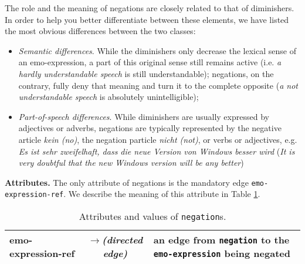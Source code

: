 \documentclass[11pt,a4paper]{article}
\newlength{\clmnwidth}
\theoremstyle{mytheoremstyle}
\begin{document}
The role and the meaning of negations are closely related to that of
diminishers.  In order to help you better differentiate between these
elements, we have listed the most obvious differences between the two
classes:
\begin{itemize}
  \item\textit{Semantic differences}.  While the diminishers only
    decrease the lexical sense of an emo-expression, a part of this
    original sense still remains active (i.e. \textit{a hardly
      understandable speech} is still understandable); negations, on
    the contrary, fully deny that meaning and turn it to the complete
    opposite (\textit{a not understandable speech} is absolutely
    unintelligible);

  \item\textit{Part-of-speech differences}.  While diminishers are
    usually expressed by adjectives or adverbs, negations are
    typically represented by the negative article \textit{kein (no)},
    the negation particle \textit{nicht (not)}, or verbs or
    adjectives, e.g.  \textit{Es ist sehr zweifelhaft, dass die neue
      Version von Windows besser wird} (\textit{It is very doubtful
      that the new Windows version will be any better})

\end{itemize}

\noindent\textbf{Attributes.} The only attribute of negations is the
mandatory edge \texttt{emo-expression-ref}.  We describe the meaning
of this attribute in Table \ref{tbl:negation}.
\begin{center}
  \begin{table}
    \caption{Attributes and values of \texttt{negation}s.}
    \begin{tabular}{|l|c|p{0.875\clmnwidth}|}\hline
      emo-expression-ref & \textit{$\longrightarrow$\newline(directed
        edge)} & an edge from \texttt{negation} to the
      \texttt{emo-expression} being negated\\\hline
    \end{tabular}
    \label{tbl:negation}
  \end{table}
\end{center}
\end{document}
